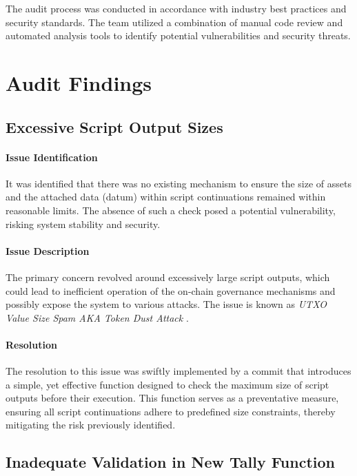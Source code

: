 \documentclass[11pt]{article}
\begin{document}
The audit process was conducted in accordance with industry best practices and security standards.
The team utilized a combination of manual code review and automated analysis tools to identify potential vulnerabilities and security threats.

\section{Audit Findings}

\subsection{Excessive Script Output Sizes}

\paragraph{Issue Identification}
It was identified that there was no existing mechanism to ensure the size of assets and the attached data (datum) within script continuations remained within reasonable limits. The absence of such a check posed a potential vulnerability, risking system stability and security.

\paragraph{Issue Description}
The primary concern revolved around excessively large script outputs, which could lead to inefficient operation of the on-chain governance mechanisms and possibly expose the system to various attacks. The issue is known as \textit{UTXO Value Size Spam AKA Token Dust Attack} \cite{CommonVuls}.

\paragraph{Resolution}
The resolution to this issue was swiftly implemented by a commit that introduces a simple, yet effective function designed to check the maximum size of script outputs before their execution. This function serves as a preventative measure, ensuring all script continuations adhere to predefined size constraints, thereby mitigating the risk previously identified.


\subsection{Inadequate Validation in New Tally Function}
\end{document}
